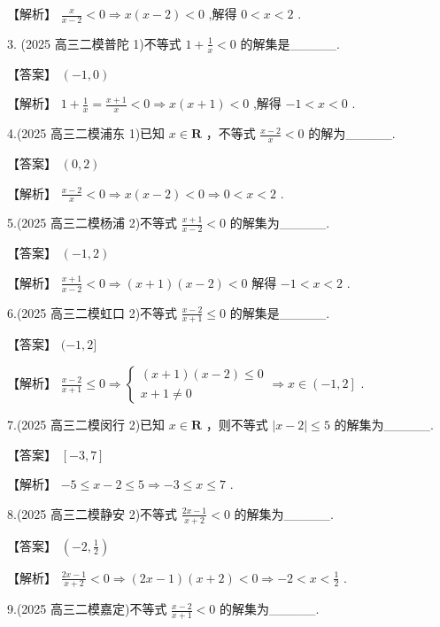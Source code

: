 \documentclass[10pt]{article}
\begin{document}
【解析】 \(\frac{x}{x - 2} < 0 \Rightarrow  x\left( {x - 2}\right)  < 0\) ,解得 \(0 < x < 2\) .

3. (2025 高三二模普陀 1)不等式 \(1 + \frac{1}{x} < 0\) 的解集是\_\_\_\_\_.

【答案】 \(\left( {-1,0}\right)\)

【解析】 \(1 + \frac{1}{x} = \frac{x + 1}{x} < 0 \Rightarrow  x\left( {x + 1}\right)  < 0\) ,解得 \(- 1 < x < 0\) .

4.(2025 高三二模浦东 1)已知 \(x \in  \mathbf{R}\) ，不等式 \(\frac{x - 2}{x} < 0\) 的解为\_\_\_\_\_.

【答案】 \(\left( {0,2}\right)\)

【解析】 \(\frac{x - 2}{x} < 0 \Rightarrow  x\left( {x - 2}\right)  < 0 \Rightarrow  0 < x < 2\) .

5.(2025 高三二模杨浦 2)不等式 \(\frac{x + 1}{x - 2} < 0\) 的解集为\_\_\_\_\_.

【答案】 \(\left( {-1,2}\right)\)

【解析】 \(\frac{x + 1}{x - 2} < 0 \Rightarrow  \left( {x + 1}\right) \left( {x - 2}\right)  < 0\) 解得 \(- 1 < x < 2\) .

6.(2025 高三二模虹口 2)不等式 \(\frac{x - 2}{x + 1} \leq  0\) 的解集是\_\_\_\_\_.

【答案】 \(( - 1,2\rbrack\)

【解析】 \(\frac{x - 2}{x + 1} \leq  0 \Rightarrow  \left\{  {\begin{array}{l} \left( {x + 1}\right) \left( {x - 2}\right)  \leq  0 \\  x + 1 \neq  0 \end{array} \Rightarrow  x \in  \left( {-1,2}\right\rbrack  }\right.\) .

7.(2025 高三二模闵行 2)已知 \(x \in  \mathbf{R}\) ，则不等式 \(\left| {x - 2}\right|  \leq  5\) 的解集为\_\_\_\_\_.

【答案】 \(\left\lbrack  {-3,7}\right\rbrack\)

【解析】 \(- 5 \leq  x - 2 \leq  5 \Rightarrow   - 3 \leq  x \leq  7\) .

8.(2025 高三二模静安 2)不等式 \(\frac{{2x} - 1}{x + 2} < 0\) 的解集为\_\_\_\_\_.

【答案】 \(\left( {-2,\frac{1}{2}}\right)\)

【解析】 \(\frac{{2x} - 1}{x + 2} < 0 \Rightarrow  \left( {{2x} - 1}\right) \left( {x + 2}\right)  < 0 \Rightarrow   - 2 < x < \frac{1}{2}\) .

9.(2025 高三二模嘉定)不等式 \(\frac{x - 2}{x + 1} < 0\) 的解集为\_\_\_\_\_.
\end{document}
